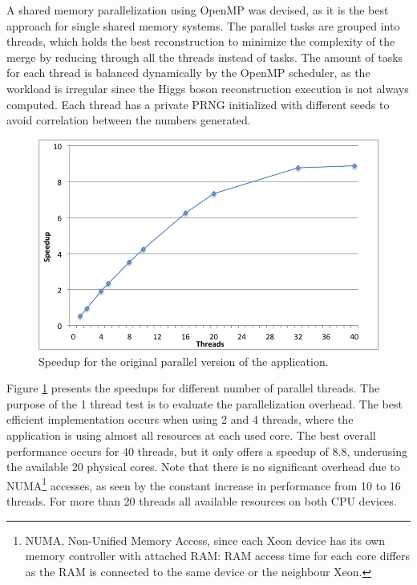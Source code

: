 A shared memory parallelization using OpenMP \cite{OpenMP} was devised, as it is the best approach for single shared memory systems. The parallel tasks are grouped into threads, which holds the best reconstruction to minimize the complexity of the merge by reducing through all the threads instead of tasks. The amount of tasks for each thread is balanced dynamically by the OpenMP scheduler, as the workload is irregular since the Higgs boson reconstruction execution is not always computed. Each thread has a private PRNG initialized with different seeds to avoid correlation between the numbers generated.

\begin{figure}[!htp]
	\begin{center}
		\includegraphics[scale=0.55]{charts/speedup_non_pointer_omp.png}
		\caption{Speedup for the \tth original parallel version of the application.}
		\label{fig:non_pointer_speedup}
	\end{center}
\end{figure}

Figure \ref{fig:non_pointer_speedup} presents the speedups for different number of parallel threads. The purpose of the 1 thread test is to evaluate the parallelization overhead. The best efficient implementation occurs when using 2 and 4 threads, where the application is using almost all resources at each used core. The best overall performance occurs for 40 threads, but it only offers a speedup of 8.8, underusing the available 20 physical cores. Note that there is no significant overhead due to NUMA\footnote{NUMA, Non-Unified Memory Access, since each Xeon device has its own memory controller with attached RAM: RAM access time for each core differs as the RAM is connected to the same device or the neighbour Xeon.} accesses, as seen by the constant increase in performance from 10 to 16 threads. For more than 20 threads all available resources on both CPU devices.

